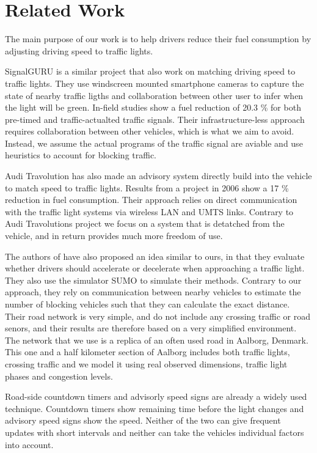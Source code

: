\section{Related Work}\label{sec:RelatedWork}
The main purpose of our work is to help drivers reduce their fuel consumption by adjusting driving speed to traffic lights.

SignalGURU\cite{SignalGURU} is a similar project that also work on matching driving speed to traffic lights.
They use windscreen mounted smartphone cameras to capture the state of nearby traffic ligths and collaboration between other user to infer when the light will be green.
In-field studies show a fuel reduction of 20.3 \% for both pre-timed and traffic-actualted traffic signals.
Their infrastructure-less approach requires collaboration between other vehicles, which is what we aim to avoid.
Instead, we assume the actual programs of the traffic signal are aviable and use heuristics to account for blocking traffic.

Audi Travolution\cite{audi} has also made an advisory system directly build into the vehicle to match speed to traffic lights.
Results from a project in 2006 show a 17 \% reduction in fuel consumption.
Their approach relies on direct communication with the traffic light systems via wireless LAN and UMTS links.
Contrary to Audi Travolutions project we focus on a system that is detatched from the vehicle, and in return provides much more freedom of use.

The authors of \cite{VANETsim} have also proposed an idea similar to ours, in that they evaluate whether drivers should accelerate or decelerate when approaching a traffic light.
They also use the simulator SUMO to simulate their methods.
Contrary to our approach, they rely on communication between nearby vehicles to estimate the number of blocking vehicles such that they can calculate the exact distance.
Their road network is very simple, and do not include any crossing traffic or road senors, and their results are therefore based on a very simplified environment. 
The network that we use is a replica of an often used road in Aalborg, Denmark. 
This one and a half kilometer section of Aalborg includes both traffic lights, crossing traffic and we model it using real observed dimensions, traffic light phases and congestion levels.

Road-side countdown timers and advisorly speed signs\cite{transyt} are already a widely used technique.
Countdown timers show remaining time before the light changes and advisory speed signs show the speed.
Neither of the two can give frequent updates with short intervals and neither can take the vehicles individual factors into account.

